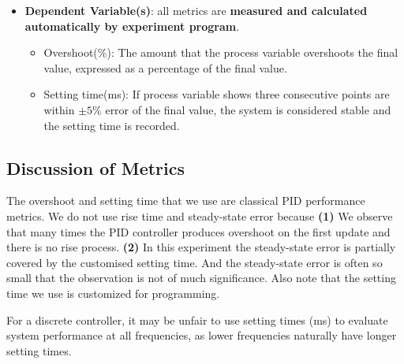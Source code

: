 \documentclass[conference]{IEEEtran}
\begin{document}
\begin{itemize}
    \item \textbf{Dependent Variable(s)}:  all metrics are \textbf{measured and calculated automatically by experiment program}.
        \begin{itemize}
            \item Overshoot(\%): The amount that the process variable overshoots the final value, expressed as a percentage of the final value.
            \item Setting time(ms): If process variable shows three consecutive points are within $\pm5\%$ error of the final value, the system is considered stable and the setting time is recorded.
        \end{itemize}
\end{itemize}

\subsection{Discussion of Metrics}
\label{Metrics}

The overshoot and setting time that we use are classical PID performance metrics. We do not use rise time and steady-state error because \textbf{(1)} We observe that many times the PID controller produces overshoot on the first update and there is no rise process. \textbf{(2)} In this experiment the steady-state error is partially covered by the customised setting time. And the steady-state error is often so small that the observation is not of much significance. Also note that the setting time we use is customized for programming.

For a discrete controller, it may be unfair to use setting times (ms) to evaluate system performance at all frequencies, as lower frequencies naturally have longer setting times. 
\end{document}
